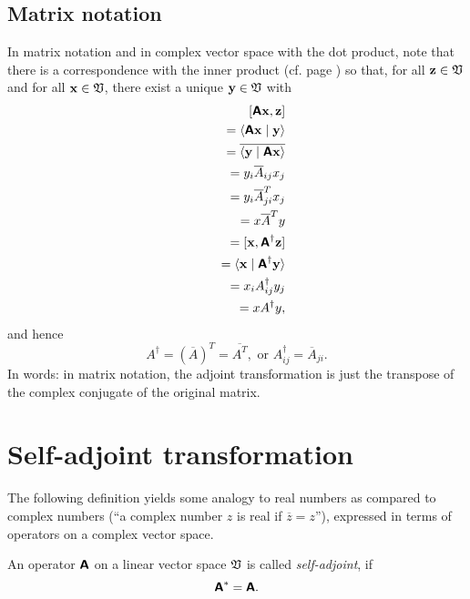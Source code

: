\subsection{Matrix notation}

In matrix notation and in complex vector space with the dot product,
note that there is a correspondence with the inner product
(cf. page \pageref{2011-m-corr-bil-ip})
so that, for all ${\bf z}\in {\frak V}$ and for all ${\bf x}\in {\frak V}$,
 there exist a unique ${\bf y}\in {\frak V}$ with
\begin{equation}
\begin{split}
[\textsf{\textbf{A}}{\bf x}, {\bf z}]\\
\qquad =\langle \textsf{\textbf{A}} {\bf x}\mid {\bf y}\rangle  \\
\qquad =\overline{ \langle{\bf y}\mid \textsf{\textbf{A}} {\bf x}\rangle } \\
\qquad = y_i\overline{ A}_{ij} x_j  \\
\qquad = y_i\overline{ A}_{ji}^T x_j  \\
\qquad \qquad  = x\overline{ A}^T y\\
=
[{\bf x}, \textsf{\textbf{A}}^\dagger {\bf z}]\\
\qquad =
\langle {\bf x}\mid \textsf{\textbf{A}}^\dagger {\bf y}\rangle        \\
\qquad = x_i A_{ij}^\dagger y_j   \\
\qquad \qquad   =   x A ^\dagger y,
\end{split}
\end{equation}
and hence
\begin{equation}
A ^\dagger =(\overline{ A})^T =\overline{ A^T}, \textrm{ or } A^\dagger_{ij}=\overline{A}_{ji} .
\end{equation}
In words: in matrix notation, the adjoint transformation is just the
transpose of the complex conjugate of the original matrix.

\section{Self-adjoint transformation}



The following definition yields some analogy to real numbers as compared to complex numbers
(``a complex number $z$ is real if $\overline{z}=z$''),
expressed in terms of operators on a complex vector space.


An operator    $\textsf{\textbf{A}}$   on a linear vector space   ${\frak V}$
is called {\em self-adjoint}, if
\begin{equation}
\textsf{\textbf{A}}^{\ast}=
\textsf{\textbf{A}}.
\end{equation}

